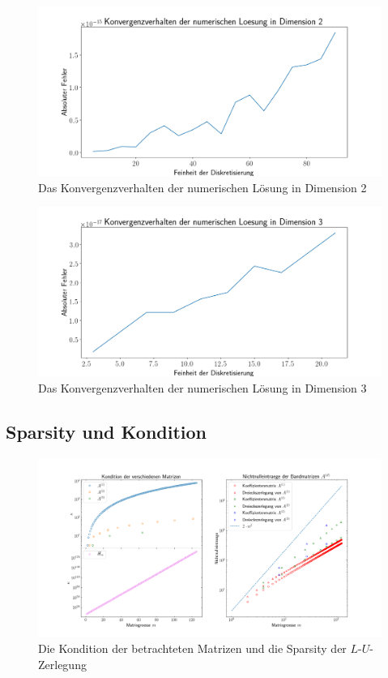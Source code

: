 \documentclass[smallheadings]{scrartcl}
\numberwithin{equation}{section}
\begin{document}
\begin{figure}
	\centering
	\includegraphics[width=\linewidth]{Bericht/Bilder2/konvdim2}
	\caption{Das Konvergenzverhalten der numerischen Lösung in Dimension 2}
	\label{fig:konvdim2}
\end{figure}

\begin{figure}
	\centering
	\includegraphics[width=\linewidth]{Bericht/Bilder2/konvdim3}
	\caption{Das Konvergenzverhalten der numerischen Lösung in Dimension 3}
	\label{fig:konvdim3}
\end{figure}

\subsection{Sparsity und Kondition}

\begin{figure}
	\centering
	\includegraphics[width=\linewidth]{Bericht/Bilder/sparsekon}
	\caption{Die Kondition der betrachteten Matrizen und die Sparsity der $L$-$U$-Zerlegung}
	\label{fig:sparsekon}
\end{figure}
\end{document}

